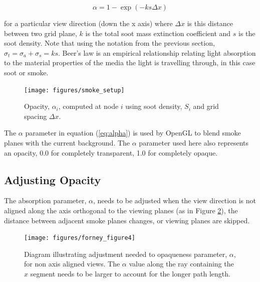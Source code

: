 \begin{equation}
\alpha=1-\exp(-ks\Delta x) \label{eq:alpha}
\end{equation}

\noindent for a particular view direction (down the x axis) where $\Delta x$ is this distance between two grid plane, $k$ is the total soot mass extinction coefficient and $s$ is the soot density.  Note that using the notation from the previous section, $\sigma_t=\sigma_a+\sigma_s=ks$.  Beer's law is an empirical relationship relating light absorption to the material properties of the media the light is travelling through, in this case soot or smoke.

\begin{figure}[\figoptions]
\begin{center}
\texttt{[image: figures/smoke\_setup]}
\end{center}
\caption {Opacity, $\alpha_i$, computed at node $i$ using soot density, $S_i$ and grid spacing $\Delta x$.}
\label{figsmokesetup}
\end{figure}

The $\alpha$ parameter in equation (\ref{eq:alpha}) is used by OpenGL to blend smoke planes with the current background.  The $\alpha$ parameter used here also represents an opacity, 0.0 for completely transparent, 1.0 for completely opaque.

%
%

\subsection{Adjusting Opacity}

The absorption parameter, $\alpha$, needs to be adjusted when the view direction is not aligned along the axis orthogonal to the viewing planes (as in Figure \ref{figray}), the distance between adjacent smoke planes changes, or viewing planes are skipped.

\begin{figure}[\figoptions]
\centerline{\texttt{[image: figures/forney\_figure4]}}
\caption [Diagram illustrating the adjustment needed to opaqueness
parameter, $\alpha$, for non axis aligned views.] { Diagram
illustrating adjustment needed to opaqueness parameter, $\alpha$,
for non axis aligned views. The $\alpha$ value along the ray
containing the $\hat{x}$ segment needs to be larger to account for
the longer path length. } \label{figray}
\end{figure}

